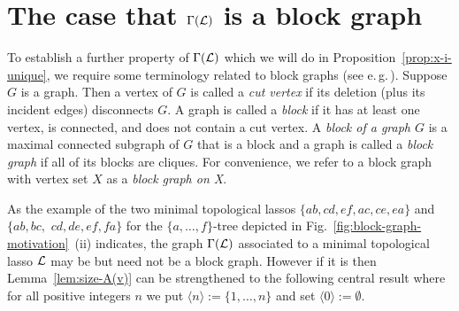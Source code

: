 \section{The case that $\Gamma({\mathcal L})$ is a block graph}
\label{sec:blockgraph}

To establish a further property of $\Gamma({\mathcal L})$ which we will do in
Proposition~\ref{prop:x-i-unique}, we require some terminology related to
block graphs (see e.\,g.\,\cite{diestel}).  Suppose $G$ is a graph. Then a
vertex of $G$ is called a {\em cut vertex} if its deletion (plus its incident
edges) disconnects $G$. A graph is called a {\em block} if it has at least one
vertex, is connected, and does not contain a cut vertex. A {\em block of a
  graph $G$} is a maximal connected subgraph of $G$ that is a block and a
graph is called a {\em block graph} if all of its blocks are cliques. For
convenience, we refer to a block graph with vertex set $X$ as a {\em block
  graph on X}.

As the example of the two minimal topological lassos $
\{ab,cd,ef,ac,ce,ea\}$ and $
\{ab, bc,$ $cd, de, ef, fa\}$ for the $\{a,\ldots,f\}$-tree depicted in
Fig.~\ref{fig:block-graph-motivation}~(ii) indicates, the graph $\Gamma({\mathcal L})$
associated to a minimal topological lasso ${\mathcal L}$ may be but need not be a block
graph.  However if it is then Lemma~\ref{lem:size-A(v)} can be strengthened to
the following central result where for all positive integers $n$ we put
$\langle n\rangle :=\{1,\ldots, n\}$ and set $\langle 0\rangle:=\emptyset$.

